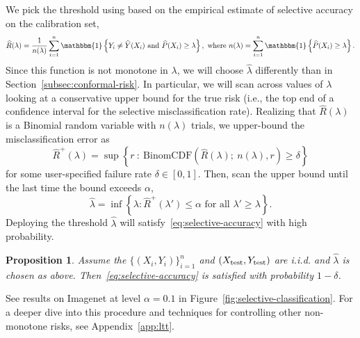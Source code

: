\documentclass[10pt]{article}
\newtheorem{prop}{Proposition}
\newcommand{\lhat}{\hat{\lambda}}
\newcommand{\Rhat}{\widehat{R}}
\newcommand{\ind}[1]{\mathbbm{1}\left\{#1\right\}}
\begin{document}
We pick the threshold using based on the empirical estimate of selective accuracy on the calibration set,
\begin{equation}
    \label{eq:rhat-selective-classification}
    \Rhat(\lambda) = \frac{1}{n(\lambda)}\sum\limits_{i=1}^n \ind{Y_{i} \neq \widehat{Y}(X_{i}) \text{ and } \widehat{P}(X_i) \geq \lambda}, \text{ where } n(\lambda) = \sum\limits_{i=1}^n \ind{ \widehat{P}(X_i) \geq \lambda }.
\end{equation}
Since this function is not monotone in $\lambda$, we will choose $\lhat$ differently than in Section~\ref{subsec:conformal-risk}. In particular, we will scan across values of $\lambda$ looking at a conservative upper bound for the true risk (i.e., the top end of a confidence interval for the selective misclassification rate).
Realizing that $\Rhat(\lambda)$ is a Binomial random variable with $n(\lambda)$ trials, we upper-bound the misclassification error as
\begin{equation}
    \Rhat^+(\lambda) = \sup\left\{ r \: : \: \text{BinomCDF}( \Rhat(\lambda) ; \: n(\lambda),r) \geq \delta \right\}
\end{equation}
for some user-specified failure rate $\delta \in [0,1]$.
Then, scan the upper bound until the last time the bound exceeds $\alpha$,
\begin{equation}
    \label{eq:lhat-selective-classification}
    \lhat = \inf\left\{\lambda : \Rhat^+(\lambda') \leq \alpha \text{ for all } \lambda' \geq \lambda \right\}.
\end{equation}
Deploying the threshold $\lhat$ will satisfy~\eqref{eq:selective-accuracy} with high probability.
\begin{prop}
Assume the $\{(X_i,Y_i)\}_{i=1}^n$ and $(X_{\rm test},Y_{\rm test})$ are i.i.d. and $\lhat$ is chosen as above. Then~\eqref{eq:selective-accuracy} is satisfied with probability $1-\delta$.
\end{prop}

See results on Imagenet at level $\alpha=0.1$ in Figure~\ref{fig:selective-classification}.
For a deeper dive into this procedure and techniques for controlling other non-monotone risks, see Appendix~\ref{app:ltt}.
\end{document}
